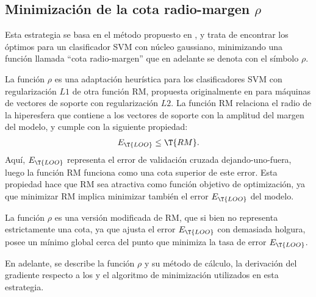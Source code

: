 %
%
\subsection{Minimización de la cota radio-margen ${\rho}$}
%
Esta estrategia se basa en el método propuesto en \cite{chung}, y
trata de encontrar los  óptimos para un clasificador SVM con
núcleo gaussiano, minimizando una función llamada ``cota
radio-margen'' que en adelante se denota con el símbolo $\rho$.

La función $\rho$ es una adaptación heurística para los clasificadores
SVM con regularización $L1$ de otra función {RM}, propuesta
originalmente en \cite{vapnik} para máquinas de vectores de soporte
con regularización $L2$.
La función {RM} relaciona el radio de la hiperesfera que contiene a
los vectores de soporte con la amplitud del margen del modelo, y
cumple con la siguiente propiedad:
%
\begin{align}
  E_{\T{LOO}} \leq \T{RM}.
\end{align}
%
Aquí, $E_{\T{LOO}}$ representa el error de validación cruzada
dejando-uno-fuera, luego la función {RM} funciona como una cota
superior de este error.
Esta propiedad hace que {RM} sea atractiva como función objetivo de
optimización, ya que minimizar {RM} implica minimizar también el error
$E_{\T{LOO}}$ del modelo.

La función $\rho$ es una versión modificada de {RM}, que si bien no
representa estrictamente una cota, ya que ajusta el error
$E_{\T{LOO}}$ con demasiada holgura, posee un mínimo global cerca del
punto que minimiza la tasa de error $E_{\T{LOO}}$.

En adelante, se describe la función $\rho$ y su método de cálculo, la
derivación del gradiente respecto a los  y el algoritmo de
minimización utilizados en esta estrategia.
